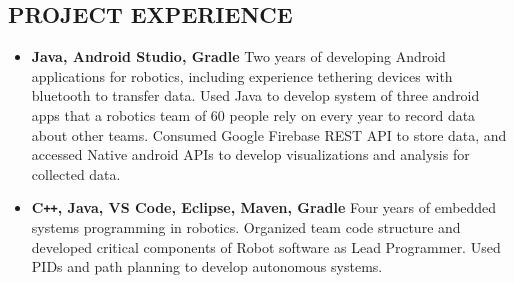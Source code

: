 \documentclass[overlapped]{res}
\begin{document}
\begin{resume}
    \section{PROJECT EXPERIENCE}

    \begin{itemize}[label={}]  \itemsep -2pt %
        \item \textbf{Java, Android Studio, Gradle}
              Two years of developing Android applications for robotics, including experience tethering devices with bluetooth to transfer data.
            Used Java to develop system of three android apps that a robotics team of 60 people rely on every year to record data about other teams.
             Consumed Google Firebase REST API to store data, and accessed Native android APIs to develop visualizations and analysis for collected data.
        \item \textbf{C\texttt{++}, Java, VS Code, Eclipse, Maven, Gradle}
              Four years of embedded systems programming in robotics. Organized team code structure and developed critical components of Robot software as Lead Programmer.
              Used PIDs and path planning to develop autonomous systems.
    \end{itemize}


\end{resume}
\end{document}
